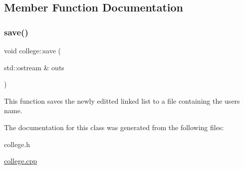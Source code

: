 \subsection{Member Function Documentation}
\mbox{\label{classcollege_ae86e11e6643736a60b6df911820c6510}} 
\subsubsection{\texorpdfstring{save()}{save()}}
{\footnotesize\ttfamily void college\+::save (\begin{DoxyParamCaption}\item[{std\+::ostream \&}]{outs }\end{DoxyParamCaption})}

This function saves the newly editted linked list to a file containing the users name. 

The documentation for this class was generated from the following files\+:\begin{DoxyCompactItemize}
\item 
college.\+h\item 
\hyperlink{college_8cpp}{college.\+cpp}\end{DoxyCompactItemize}
